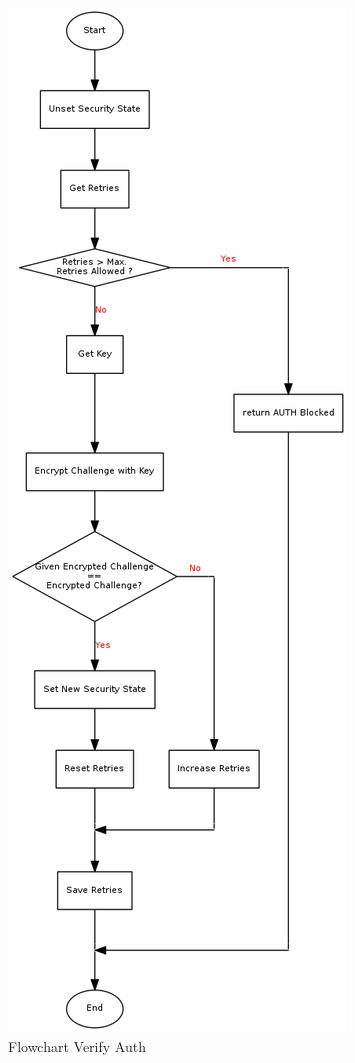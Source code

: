 \begin{figure}[!h]
\centering
\includegraphics[height=0.9\textheight]{image/state/flow_verifykey.png}
\caption{Flowchart Verify Auth}
\label{fig-flow-verifyauth}
\end{figure}

